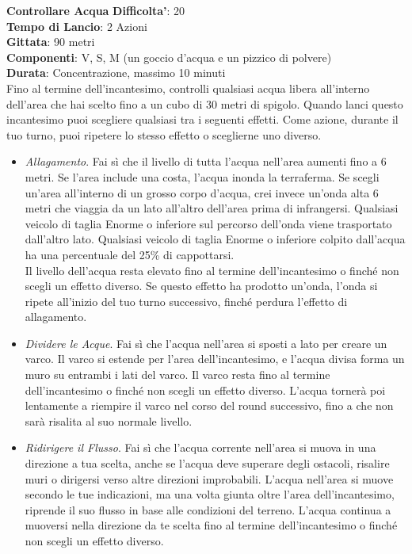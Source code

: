 \begin{multicols}{2}
\medskip\textbf{Controllare Acqua}
\textbf{Difficolta'}: 20\\
\textbf{Tempo di Lancio}: 2 Azioni\\
\textbf{Gittata}: 90 metri\\
\textbf{Componenti}: V, S, M (un goccio d’acqua e un pizzico di polvere)\\
\textbf{Durata}: Concentrazione, massimo 10 minuti\\
Fino al termine dell’incantesimo, controlli qualsiasi acqua libera all’interno dell’area che hai scelto fino a un cubo di 30 metri di spigolo. Quando lanci questo incantesimo puoi scegliere qualsiasi tra i seguenti effetti. Come azione, durante il tuo turno, puoi ripetere lo stesso effetto o sceglierne uno diverso.\\
\begin{itemize}
	\item 
\textit{Allagamento}. Fai sì che il livello di tutta l’acqua nell’area aumenti fino a 6 metri. Se l’area include una costa, l’acqua inonda la terraferma. Se scegli un’area all’interno di un grosso corpo d’acqua, crei invece un’onda alta 6 metri che viaggia da un lato all’altro dell’area prima di infrangersi. Qualsiasi veicolo di taglia Enorme o inferiore sul percorso dell’onda viene trasportato dall’altro lato. Qualsiasi veicolo di taglia Enorme o inferiore colpito dall’acqua ha una percentuale del 25\% di cappottarsi.\\
Il livello dell’acqua resta elevato fino al termine dell’incantesimo o finché non scegli un effetto diverso. Se questo effetto ha prodotto un’onda, l’onda si ripete all’inizio del tuo turno successivo, finché perdura l’effetto di allagamento.\\
\item 
\textit{Dividere le Acque}. Fai sì che l’acqua nell’area si sposti a lato per creare un varco. Il varco si estende per l’area dell’incantesimo, e l’acqua divisa forma un muro su entrambi i lati del varco. Il varco resta fino al termine dell’incantesimo o finché non scegli un effetto diverso. L’acqua tornerà poi lentamente a riempire il varco nel corso del round successivo, fino a che non sarà risalita al suo normale livello.
\item 
\textit{Ridirigere il Flusso}. Fai sì che l’acqua corrente nell’area si muova in una direzione a tua scelta, anche se l’acqua deve superare degli ostacoli, risalire muri o dirigersi verso altre direzioni improbabili. L’acqua nell’area si muove secondo le tue indicazioni, ma una volta giunta oltre l’area dell’incantesimo, riprende il suo  flusso in base alle condizioni del terreno. L’acqua continua a muoversi nella direzione da te scelta fino al termine dell’incantesimo o finché non scegli un effetto diverso.

\end{itemize}
\end{multicols}
